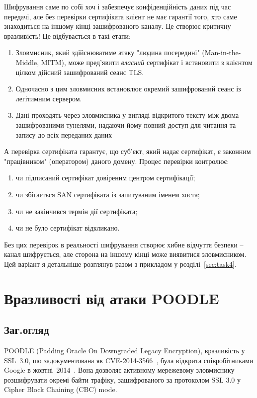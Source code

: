 Шифрування саме по собі хоч і забезпечує конфіденційність даних під час передачі, але без перевірки сертифіката
клієнт не має гарантії того, хто саме знаходиться на іншому кінці зашифрованого каналу. Це створює критичну
вразливість! Це відбувається в такі етапи:

\begin{enumerate}
    \item Зловмисник, який здійснюватиме атаку "людина посередині"{} (Man-in-the-Middle, MITM), може пред'явити
        \textit{власний} сертифікат і встановити з клієнтом цілком дійсний зашифрований сеанс TLS.
    \item Одночасно з цим зловмисник встановлює окремий зашифрований сеанс із легітимним сервером.
    \item Дані проходять через зловмисника у вигляді відкритого тексту між двома зашифрованими тунелями, надаючи 
        йому повний доступ для читання та запису до всіх переданих даних
\end{enumerate}

А перевірка сертифіката гарантує, що суб'єкт, який надає сертифікат, є законним "працівником"{} (оператором) даного 
домену. Процес перевірки контролює: 
\begin{enumerate}[label = \arabic*)]
    \item чи підписаний сертифікат довіреним центром сертифікації;
    \item чи збігається SAN сертифіката із запитуваним іменем хоста;
    \item чи не закінчився термін дії сертифіката; 
    \item чи не було сертифікат відкликано. 
\end{enumerate}
Без цих перевірок в реальності шифрування створює хибне відчуття безпеки -- канал шифрується, але сторона на 
іншому кінці може виявитися зловмисником. Цей варіант я детальніше розглянув разом з прикладом у розділі~\ref{sec:task4}.

\section{Вразливості від атаки POODLE}
\label{sec:task3}

\subsection{Заг.огляд}

POODLE (Padding Oracle On Downgraded Legacy Encryption), вразливість у SSL~3.0, шо задокументована як CVE-2014-3566~\cite{poodle_cve}, 
була відкрита співробітниками Google в жовтні~2014~\cite{poodle_paper}. Вона дозволяє активному мережевому зловмиснику 
розшифрувати окремі байти трафіку, зашифрованого за протоколом SSL 3.0 у Cipher Block Chaining (CBC) mode.

